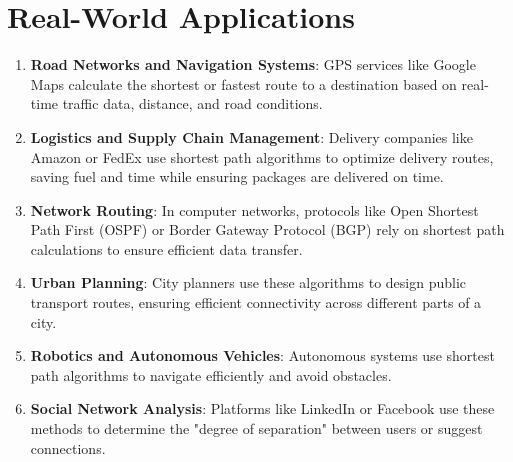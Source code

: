 \documentclass{article}
\begin{document}
	\section{Real-World Applications}

\begin{enumerate}
	\item \textbf{Road Networks and Navigation Systems}: GPS services like Google Maps calculate the shortest or fastest route to a destination based on real-time traffic data, distance, and road conditions.
	\item \textbf{Logistics and Supply Chain Management}: Delivery companies like Amazon or FedEx use shortest path algorithms to optimize delivery routes, saving fuel and time while ensuring packages are delivered on time.
	\item \textbf{Network Routing}: In computer networks, protocols like Open Shortest Path First (OSPF) or Border Gateway Protocol (BGP) rely on shortest path calculations to ensure efficient data transfer.
	\item \textbf{Urban Planning}: City planners use these algorithms to design public transport routes, ensuring efficient connectivity across different parts of a city.
	\item \textbf{Robotics and Autonomous Vehicles}: Autonomous systems use shortest path algorithms to navigate efficiently and avoid obstacles.
	\item \textbf{Social Network Analysis}: Platforms like LinkedIn or Facebook use these methods to determine the "degree of separation" between users or suggest connections.
\end{enumerate}
\end{document}
